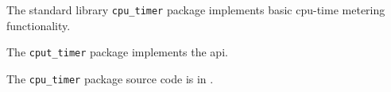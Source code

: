 
The standard library {\tt cpu\_timer} package implements basic cpu-time metering 
functionality.

The {\tt cput\_timer} package implements the  api.

The {\tt cpu\_timer} package source code is in .

